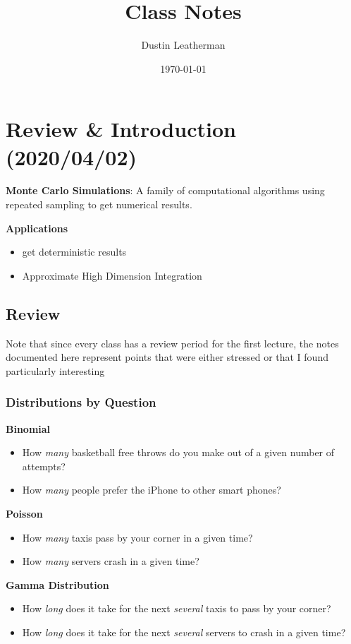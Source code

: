 \documentclass[11pt]{article}
\author{Dustin Leatherman}
\date{\today}
\title{Class Notes}
\begin{document}
\maketitle
\tableofcontents


\section{Review \& Introduction (2020/04/02)}
\label{sec:orgf218f8e}

\textbf{Monte Carlo Simulations}: A family of computational algorithms using repeated
 sampling to get numerical results.


\textbf{Applications}
\begin{itemize}
\item get deterministic results
\item Approximate High Dimension Integration
\end{itemize}

\subsection{Review}
\label{sec:org312cd6b}

Note that since every class has a review period for the first lecture, the notes
documented here represent points that were either stressed or that I found
particularly interesting
\subsubsection{Distributions by Question}
\label{sec:org2c62abf}

\textbf{Binomial}
\begin{itemize}
\item How \emph{many} basketball free throws do you make out of a given number of attempts?
\item How \emph{many} people prefer the iPhone to other smart phones?
\end{itemize}

\textbf{Poisson}
\begin{itemize}
\item How \emph{many} taxis pass by your corner in a given time?
\item How \emph{many} servers crash in a given time?
\end{itemize}

\textbf{Gamma Distribution}
\begin{itemize}
\item How \emph{long} does it take for the next \emph{several} taxis to pass by your corner?
\item How \emph{long} does it take for the next \emph{several} servers to crash in a given time?
\end{itemize}
\end{document}
